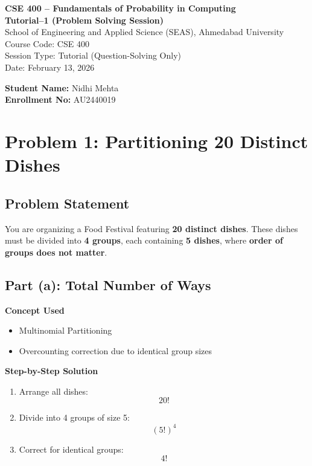 \documentclass[11pt]{article}
\begin{document}
\begin{center}
{\Large \textbf{CSE 400 – Fundamentals of Probability in Computing}}\\[0.2cm]
{\large \textbf{Tutorial–1 (Problem Solving Session)}}\\[0.3cm]
School of Engineering and Applied Science (SEAS), Ahmedabad University\\
Course Code: CSE 400\\
Session Type: Tutorial (Question-Solving Only)\\
Date: February 13, 2026
\end{center}

\vspace{0.5cm}

\noindent
\textbf{Student Name:} Nidhi Mehta\\
\textbf{Enrollment No:} AU2440019



\section*{Problem 1: Partitioning 20 Distinct Dishes}

\subsection*{Problem Statement}

You are organizing a Food Festival featuring \textbf{20 distinct dishes}. These dishes must be divided into \textbf{4 groups}, each containing \textbf{5 dishes}, where \textbf{order of groups does not matter}.

\subsection*{Part (a): Total Number of Ways}

\textbf{Concept Used}
\begin{itemize}
    \item Multinomial Partitioning
    \item Overcounting correction due to identical group sizes
\end{itemize}

\textbf{Step-by-Step Solution}

\begin{enumerate}
    \item Arrange all dishes:
    \[
    20!
    \]

    \item Divide into 4 groups of size 5:
    \[
    (5!)^4
    \]

    \item Correct for identical groups:
    \[
    4!
    \]
\end{enumerate}
\end{document}
